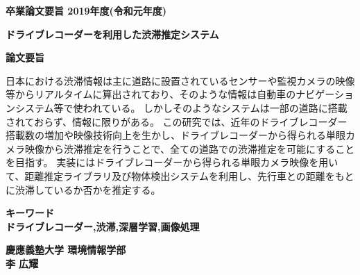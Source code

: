 \begin{center}
\textbf{\Large 卒業論文要旨 2019年度(令和元年度)}

\vspace{6.18mm}

\textbf{\Large ドライブレコーダーを利用した渋滞推定システム}
\end{center}

\vspace{10mm}

\begin{flushleft}
\textbf{論文要旨}\\
\end{flushleft}
日本における渋滞情報は主に道路に設置されているセンサーや監視カメラの映像等からリアルタイムに算出されており、そのような情報は自動車のナビゲーションシステム等で使われている。
しかしそのようなシステムは一部の道路に搭載されておらず、情報に限りがある。
この研究では、近年のドライブレコーダー搭載数の増加や映像技術向上を生かし、ドライブレコーダーから得られる単眼カメラ映像から渋滞推定を行うことで、全ての道路での渋滞推定を可能にすることを目指す。
実装にはドライブレコーダーから得られる単眼カメラ映像を用いて、距離推定ライブラリ及び物体検出システムを利用し、先行車との距離をもとに渋滞しているか否かを推定する。


\begin{flushleft}
\textbf{キーワード}\\
\textbf{ドライブレコーダー,渋滞,深層学習,画像処理}

\end{flushleft}

\begin{flushright}
\textbf{慶應義塾大学 環境情報学部}\\
\textbf{李 広耀}
\end{flushright}
\newpage

